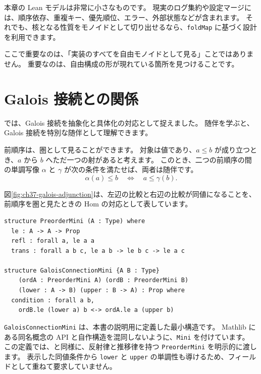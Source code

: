 本章の Lean モデルは非常に小さなものです。
現実のログ集約や設定マージには、順序依存、重複キー、優先順位、エラー、外部状態などが含まれます。
それでも、核となる性質をモノイドとして切り出せるなら、\texttt{foldMap} に基づく設計を利用できます。

ここで重要なのは、「実装のすべてを自由モノイドとして見る」ことではありません。
重要なのは、自由構成の形が現れている箇所を見つけることです。

\section{Galois 接続との関係}
\label{sec:ch37-galois}

では、Galois 接続を抽象化と具体化の対応として捉えました。
随伴を学ぶと、Galois 接続を特別な随伴として理解できます。

前順序は、圏として見ることができます。
対象は値であり、\(a \leq b\) が成り立つとき、\(a\) から \(b\) へただ一つの射があると考えます。
このとき、二つの前順序の間の単調写像 \(\alpha\) と \(\gamma\) が次の条件を満たせば、両者は随伴です。
\[
  \alpha(a) \leq b
  \quad\Longleftrightarrow\quad
  a \leq \gamma(b).
\]


図\ref{fig:ch37-galois-adjunction}は、左辺の比較と右辺の比較が同値になることを、前順序を圏と見たときの Hom の対応として表しています。

\begin{listing}[htbp]
\begin{verbatim}
structure PreorderMini (A : Type) where
  le : A -> A -> Prop
  refl : forall a, le a a
  trans : forall a b c, le a b -> le b c -> le a c

structure GaloisConnectionMini {A B : Type}
    (ordA : PreorderMini A) (ordB : PreorderMini B)
    (lower : A -> B) (upper : B -> A) : Prop where
  condition : forall a b,
    ordB.le (lower a) b <-> ordA.le a (upper b)
\end{verbatim}
\caption{\texttt{PreorderMini}・\texttt{GaloisConnectionMini}}
\label{lst:ch37_galois}
\end{listing}

\texttt{GaloisConnectionMini} は、本書の説明用に定義した最小構造です。
Mathlib にある同名概念の API と自作構造を混同しないように、\texttt{Mini} を付けています。
この定義では、と同様に、反射律と推移律を持つ \texttt{PreorderMini} を明示的に渡します。
表示した同値条件から \texttt{lower} と \texttt{upper} の単調性も導けるため、フィールドとして重ねて要求していません。

